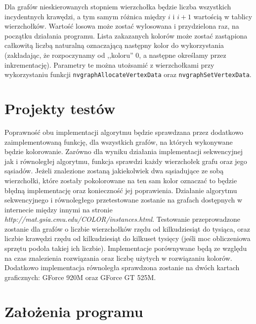 \documentclass{article}
\begin{document}
	Dla grafów nieskierowanych stopniem wierzchołka będzie liczba wszystkich incydentnych krawędzi, a tym samym różnica między $i$ i $i+1$ wartością w tablicy wierzchołków. Wartość losowa może zostać wylosowana i przydzielona raz, na początku działania programu. Lista zakazanych kolorów może zostać zastąpiona całkowitą liczbą naturalną oznaczającą następny kolor do wykorzystania (zakładając, że rozpoczynamy od ,,koloru'' 0, a następne określamy przez inkrementację). Parametry te można utożsamić z wierzchołkami przy wykorzystaniu funkcji \texttt{nvgraphAllocateVertexData} oraz \texttt{nvgraphSetVertexData}.
	
	\section{Projekty testów}
	Poprawność obu implementacji algorytmu będzie sprawdzana przez dodatkowo zaimplementowaną funkcję, dla wszystkich grafów, na których wykonywane będzie kolorowanie. Zarówno dla wyniku działania implementacji sekwencyjnej jak i równoległej algorytmu, funkcja sprawdzi każdy wierzchołek grafu oraz jego sąsiadów. Jeżeli znalezione zostaną jakiekolwiek dwa sąsiadujące ze sobą wierzchołki, które zostały pokolorowane na ten sam kolor oznaczać to będzie błędną implementację oraz konieczność jej poprawienia. Działanie algorytmu sekwencyjnego i równoległego przetestowane zostanie na grafach dostępnych w internecie między innymi na stronie \textit{http://mat.gsia.cmu.edu/COLOR/instances.html}. Testowanie przeprowadzone zostanie dla grafów o liczbie wierzchołków rzędu od kilkudziesiąt do tysiąca, oraz liczbie krawędzi rzędu od kilkudziesiąt do kilkuset tysięcy (jeśli moc obliczeniowa sprzętu podoła takiej ich liczbie). Implementacje porównywane będą ze względu na czas znalezienia rozwiązania oraz liczbę użytych w rozwiązaniu kolorów. Dodatkowo implementacja równoległa sprawdzona zostanie na dwóch kartach graficznych: GForce 920M oraz GForce GT 525M.
	\section{Założenia programu}
	
	

 


\end{document}
